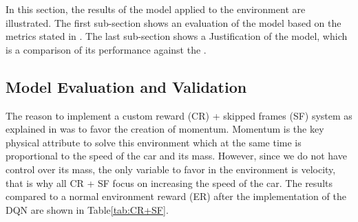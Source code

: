 In this section, the results of the model applied to the environment are illustrated. The first sub-section shows an evaluation of the model based on the metrics stated in . The last sub-section shows a Justification of the model, which is a comparison of its performance against the .
\subsection{Model Evaluation and Validation}
The reason to implement a custom reward (CR) + skipped frames (SF) system as explained in   was to favor the creation of momentum. Momentum is the key physical attribute to solve this environment which at the same time is proportional to the speed of the car and its mass. However, since we do not have control over its mass, the only variable to favor in the environment is velocity, that is why all CR + SF focus on increasing the speed of the car. The results compared to a normal environment reward (ER) after the implementation of the DQN are shown in Table\ref{tab:CR+SF}.
